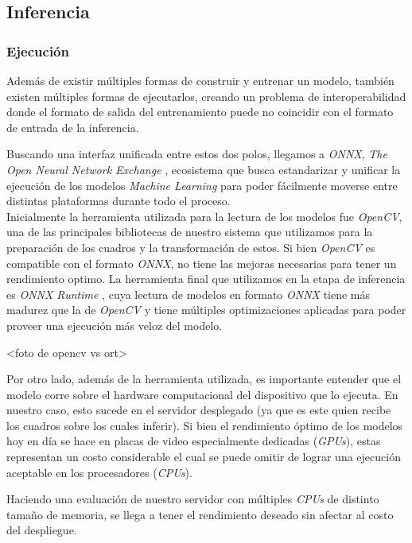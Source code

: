 \documentclass[a4paper]{article}
\begin{document}
\subsection{Inferencia}

\subsubsection{Ejecución}

Además de existir múltiples formas de construir y entrenar un modelo, también existen múltiples formas de ejecutarlos, creando un problema de interoperabilidad donde el formato de salida del entrenamiento puede no coincidir con el formato de entrada de la inferencia.

Buscando una interfaz unificada entre estos dos polos, llegamos a \textit{ONNX}, \textit{The Open Neural Network Exchange} \cite{onnx}, ecosistema que busca estandarizar y unificar la ejecución de los modelos \textit{Machine Learning} para poder fácilmente moverse entre distintas plataformas durante todo el proceso. \\

Inicialmente la herramienta utilizada para la lectura de los modelos fue \textit{OpenCV}, una de las principales bibliotecas de nuestro sistema que utilizamos para la preparación de los cuadros y la transformación de estos. Si bien \textit{OpenCV} es compatible con el formato \textit{ONNX}, no tiene las mejoras necesarias para tener un rendimiento optimo. La herramienta final que utilizamos en la etapa de inferencia es \textit{ONNX Runtime} \cite{ort}, cuya lectura de modelos en formato \textit{ONNX} tiene más madurez que la de \textit{OpenCV} y tiene múltiples optimizaciones aplicadas para poder proveer una ejecución más veloz del modelo.

<foto de opencv vs ort>

Por otro lado, además de la herramienta utilizada, es importante entender que el modelo corre sobre el hardware computacional del dispositivo que lo ejecuta. En nuestro caso, esto sucede en el servidor desplegado (ya que es este quien recibe los cuadros sobre los cuales inferir). Si bien el rendimiento óptimo de los modelos hoy en día se hace en placas de video especialmente dedicadas (\textit{GPUs}), estas representan un costo considerable el cual se puede omitir de lograr una ejecución aceptable en los procesadores (\textit{CPUs}).

Haciendo una evaluación de nuestro servidor con múltiples \textit{CPUs} de distinto tamaño de memoria, se llega a tener el rendimiento deseado sin afectar al costo del despliegue.
\end{document}
